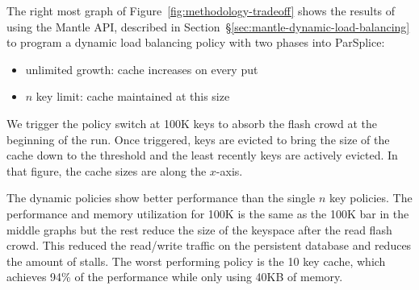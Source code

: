 %
%

The right most graph of Figure~\ref{fig:methodology-tradeoff} shows the results
of using the Mantle API, described in
Section~\S\ref{sec:mantle-dynamic-load-balancing} to program a dynamic load
balancing policy with two phases into ParSplice:

\begin{itemize}
  \item unlimited growth: cache increases on every put
  \item \(n\) key limit: cache maintained at this size
\end{itemize}

We trigger the policy switch at 100K keys to absorb the flash crowd at the
beginning of the run. Once triggered, keys are evicted to bring the size of the
cache down to the threshold and the least recently keys are actively evicted.
In that figure, the cache sizes are along the \(x\)-axis.

The dynamic policies show better performance than the single \(n\) key
policies. The performance and memory utilization for 100K is the same as the
100K bar in the middle graphs but the rest reduce the size of the keyspace
after the read flash crowd. This reduced the read/write traffic on the
persistent database and reduces the amount of stalls.  The worst performing
policy is the 10 key cache, which achieves 94\% of the performance while only
using 40KB of memory. 

